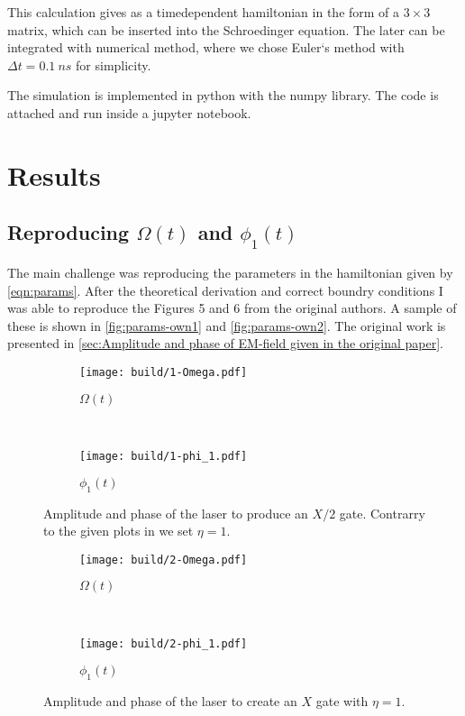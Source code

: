 \documentclass[%
reprint,
amsmath,amssymb,
aps,
]{revtex4-2}
\begin{document}
This calculation gives as a timedependent hamiltonian in the form of a $3\times 3$ matrix, which can
be inserted into the Schroedinger equation. The later can be integrated with numerical method, where
we chose Euler`s method with $\Delta t = \SI{0.1}{ns}$ for simplicity. 

The simulation is implemented in python with the numpy library. The code is attached and run inside
a jupyter notebook.

\section{Results}
\label{sec:Results}

\subsection{Reproducing $\Omega(t)$ and $\phi_1(t)$}
\label{sec:ReproducingParameters}
The main challenge was reproducing the parameters in the hamiltonian given by \autoref{eqn:params}.
After the theoretical derivation and correct boundry conditions I was able to reproduce the Figures
5 and 6 from the original authors. A sample of these is shown in \autoref{fig:params-own1} and
\autoref{fig:params-own2}.
The original work is presented in \autoref{sec:Amplitude and phase of EM-field given in the original paper}.
\begin{figure}
  \centering
  \begin{subfigure}[b]{0.45\textwidth}
    \centering
    \texttt{[image: build/1-Omega.pdf]}
    \caption{$\Omega(t)$}
    \label{fig:1-Omega}
  \end{subfigure}
  \,
  \begin{subfigure}[b]{0.45\textwidth}
    \centering
    \texttt{[image: build/1-phi\_1.pdf]}
    \caption{$\phi_1(t)$}
    \label{fig:1-phi_1}
  \end{subfigure}
  \caption{Amplitude and phase of the laser to produce an $X/2$ gate. Contrarry to the given plots in
  \cite{PhysRevApplied.16.024060} we set $\eta=1$.}
  \label{fig:params-own1}
\end{figure}


\begin{figure}
  \centering
  \begin{subfigure}[b]{0.45\textwidth}
    \centering
    \texttt{[image: build/2-Omega.pdf]}
    \caption{$\Omega(t)$}
    \label{fig:1-Omega}
  \end{subfigure}
  \,
  \begin{subfigure}[b]{0.45\textwidth}
    \centering
    \texttt{[image: build/2-phi\_1.pdf]}
    \caption{$\phi_1(t)$}
    \label{fig:1-phi_1}
  \end{subfigure}
  \caption{Amplitude and phase of the laser to create an $X$ gate with $\eta=1$.}
  \label{fig:params-own2}
\end{figure}
\end{document}
